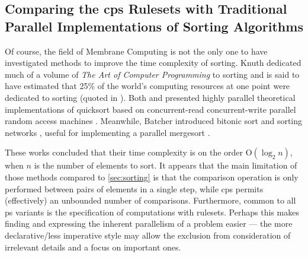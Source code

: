
\subsection{Comparing the \texorpdfstring{\gls{cps}}{cP systems} Rulesets with Traditional Parallel Implementations of Sorting Algorithms}

Of course, the field of Membrane Computing is not the only one to have investigated methods to improve the time complexity of sorting.  Knuth dedicated much of a volume of \textit{The Art of Computer Programming} to sorting \cite{Knuth1998} and is said to have estimated that 25\% of the world's computing resources at one point were dedicated to sorting (quoted in \cite{Powers1991}).  Both \citeauthor{Powers1991} \cite{Powers1991} and \citeauthor{Chlebus1991} \cite{Chlebus1991} presented highly parallel theoretical implementations of quicksort based on concurrent-read concurrent-write parallel random access machines \cite{JaJa2011}.  Meanwhile, Batcher introduced bitonic sort and sorting networks \cite{Akl2011}, useful for implementing a parallel mergesort \cite{Lee1995}.

These works concluded that their time complexity is on the order O\((\log_2 n)\), when \(n\) is the number of elements to sort.  It appears that the main limitation of those methods compared to \cref{sec:sorting} is that the comparison operation is only performed between pairs of elements in a single step, while \gls{cps} permits (effectively) an unbounded number of comparisons.  Furthermore, common to all \gls{ps} variants is the specification of computations with rulesets.  Perhaps this makes finding and expressing the inherent parallelism of a problem easier --- the more declarative/less imperative style may allow the exclusion from consideration of irrelevant details and a focus on important ones.